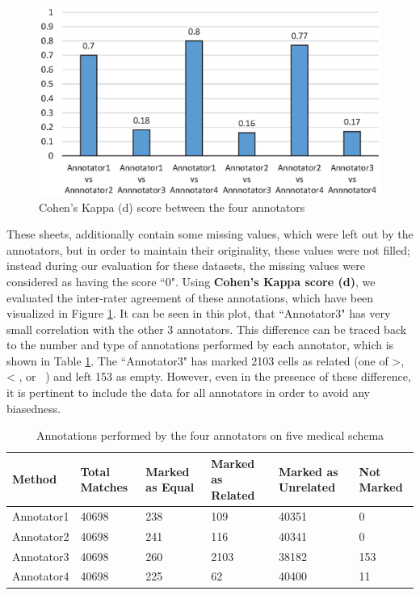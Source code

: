 \documentclass{ieeeaccess}
\begin{document}
\begin{figure}[t!]
	\centering
	\includegraphics{kappaInterAnnotatorAgrement}
	\caption{Cohen's Kappa (d) score between the four annotators}
	\label{fig:kappaInterAnnotatorAgrement}
\end{figure}

These sheets, additionally contain some missing values, which were left out by the annotators, but in order to maintain their originality, these values were not filled; instead during our evaluation for these datasets, the missing values were considered as having the score ``0". Using \textbf{Cohen's Kappa score (d)}, we evaluated the inter-rater agreement of these annotations, which have been visualized in Figure \ref{fig:kappaInterAnnotatorAgrement}. It can be seen in this plot, that ``Annotator3" has very small correlation with the other 3 annotators. This difference can be traced back to the number and type of annotations performed by each annotator, which is shown in Table \ref{tab:annotator_marking}. The ``Annotator3" has marked 2103 cells as related (one of >, < , or ~) and left 153 as empty. However, even in the presence of these difference, it is pertinent to include the data for all annotators in order to avoid any biasedness. 

\begin{table}
	\centering
	\caption{Annotations performed by the four annotators on five medical schema}
	\label{tab:annotator_marking}
	\begin{tabular}{|l|l|l|l|l|l|}
		\hline
		Method     & Total Matches & Marked as Equal & Marked as Related & Marked as Unrelated & Not Marked \\ \hline
		Annotator1 & 40698         & 238             & 109               & 40351               & 0          \\
		Annotator2 & 40698         & 241             & 116               & 40341               & 0          \\
		Annotator3 & 40698         & 260             & 2103              & 38182               & 153        \\
		Annotator4 & 40698         & 225             & 62                & 40400               & 11         \\ \hline
	\end{tabular}
\end{table}
\end{document}
